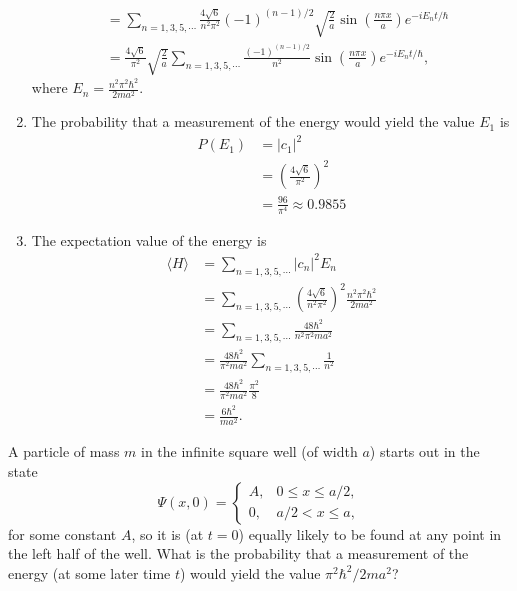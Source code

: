 \documentclass[en, oneside]{vivi}
\begin{document}
\begin{sol}
\begin{enumerate}[label=(\alph*)]
\begin{align*}
            &= \sum_{n = 1, 3, 5, \cdots} \frac{4 \sqrt{6}}{n^2 \pi^2} (-1)^{(n - 1)/2} \sqrt{\frac{2}{a}} \sin\left(\frac{n\pi x}{a}\right) e^{-iE_n t/\hbar}\\
            &= \frac{4 \sqrt{6}}{\pi^2} \sqrt{\frac{2}{a}} \sum_{n = 1, 3, 5, \cdots} \frac{(-1)^{(n - 1)/2}}{n^2} \sin\left(\frac{n\pi x}{a}\right) e^{-iE_n t/\hbar},
        \end{align*}
        where $E_n = \frac{n^2 \pi^2 \hbar^2}{2ma^2}$.
        \item The probability that a measurement of the energy would yield the value $E_1$ is
        \begin{align*}
            P(E_1) &= |c_1|^2\\
            &= \left(\frac{4 \sqrt{6}}{\pi^2}\right)^2\\
            &= \frac{96}{\pi^4} \approx 0.9855
        \end{align*}
        \item The expectation value of the energy is
        \begin{align*}
            \langle H \rangle &= \sum_{n = 1, 3, 5, \cdots} |c_n|^2 E_n\\
            &= \sum_{n = 1, 3, 5, \cdots} \left( \frac{4 \sqrt{6}}{n^2 \pi^2} \right)^2 \frac{n^2 \pi^2 \hbar^2}{2ma^2}\\
            &= \sum_{n = 1, 3, 5, \cdots} \frac{48 \hbar^2}{n^2 \pi^2 m a^2}\\
            &= \frac{48 \hbar^2}{\pi^2 m a^2} \sum_{n = 1, 3, 5, \cdots} \frac{1}{n^2}\\
            &= \frac{48 \hbar^2}{\pi^2 m a^2} \frac{\pi^2}{8}\\
            &= \frac{6 \hbar^2}{m a^2}.
        \end{align*}
    \end{enumerate}
\end{sol}

\begin{prob}
    A particle of mass $m$ in the infinite square well (of width $a$) starts out in the state
    \begin{equation*}
        \Psi(x, 0) =
        \begin{cases}
            A, & 0 \leq x \leq a/2, \\
            0, & a/2 < x \leq a,
        \end{cases}
    \end{equation*}
    for some constant $A$, so it is (at $t = 0$) equally likely to be found at any point in the left half of the well. What is the probability that a measurement of the energy (at some later time $t$) would yield the value $\pi^2 \hbar^2 / 2ma^2$?
\end{prob}
\end{document}
